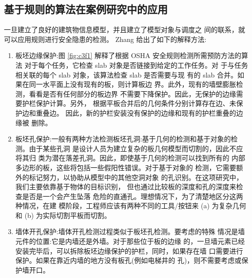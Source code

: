 \subsection{基于规则的算法在案例研究中的应用}

一旦建立了良好的建筑物信息模型，并且建立了模型对象与调度之
间的联系，就可以应用规则进行安全隐患的检测。 Zhang 给出了如下的解释方法:

\begin{enumerate}
    \item 板坯边缘保护:图 \ref{fig:c3f1} 解释了根据 OSHA 安全规则检测所需预防方法的算法
    对于每个任务，它检查 slab 对象是否链接到给定的工作任务。对
    于与任务相关联的每个 slab 对象，该算法检查 slab 是否需要与现
    有的 slab 合并。如果在同一水平面上没有现有的板，则计算板边
    界。此外，现有的墙壁膨胀检测，看看是否有任何部分的板边界
    不需要下降保护。因此，无保护的边缘需要护栏保护计算。另外，
    根据平板合并后的几何条件分别计算存在边、未保护边和重叠边。
    因此，新的护栏安装没有保护的边缘和现有的护栏重叠的边缘被
    删除。
    \item 板坯孔保护:一般有两种方法检测板坯孔洞:基于几何的检测和基于对象的检测。由于某些孔洞
    是设计人员为建立复杂的板几何模型而切割的，因此不应将其归
    类为潜在落差孔洞。因此，即使基于几何的检测可以找到所有的
    内部多边形的板，这些将包括一些假阳性错误。对于基于对象的
    检测，它需要额外的标记努力，以协助从模型中的其他空洞对象
    的孔识别。在这项研究中，我们主要依靠基于物体的目标识别，
    但也通过比较板的深度和孔的深度来检查是否是一个会产生坠落
    危险的直通孔。理想情况下，为了清楚地区分这两种情况，在建
    模阶段，工程师应该有两种不同的工具/按钮来 (a) 为复杂几何和
     (b) 为实际切割平板而切割。
    \item 墙体开孔保护:墙体开孔检测过程类似于板坯孔检测。要考虑的特殊
    情况是墙元件的位置:它是内墙还是外墙。对于那些位于板的边缘
    的，一旦墙元素已经安装完毕后，可以拆除板坯边缘保护的护栏，同时，如果存在墙
    口需要进行保护。如果在靠近内墙的地方没有板孔(例如电梯井的
    孔)，则不需要考虑或保护墙开口。
\end{enumerate}

